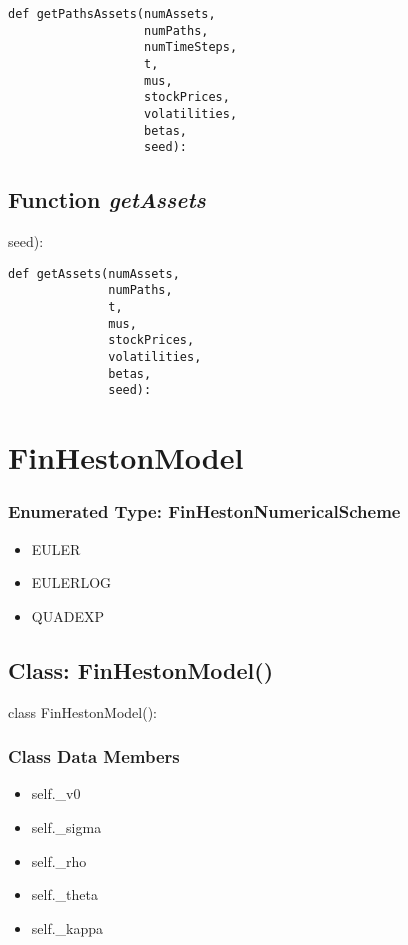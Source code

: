 \documentclass[twoside,11pt]{book}
\begin{document}
\begin{lstlisting}
def getPathsAssets(numAssets,
                   numPaths,
                   numTimeSteps,
                   t,
                   mus,
                   stockPrices,
                   volatilities,
                   betas,
                   seed):
\end{lstlisting}

\subsection{Function {\it getAssets}}
seed):

\begin{lstlisting}
def getAssets(numAssets,
              numPaths,
              t,
              mus,
              stockPrices,
              volatilities,
              betas,
              seed):
\end{lstlisting}

\newpage
\section{FinHestonModel}

\subsubsection{Enumerated Type: FinHestonNumericalScheme}
\begin{itemize}
\item{EULER}
\item{EULERLOG}
\item{QUADEXP}
\end{itemize}

\subsection{Class: FinHestonModel()}
class FinHestonModel():

\subsubsection{Class Data Members}
\begin{itemize}
\item{self.\_v0}
\item{self.\_sigma}
\item{self.\_rho}
\item{self.\_theta}
\item{self.\_kappa}
\end{itemize}
\end{document}
